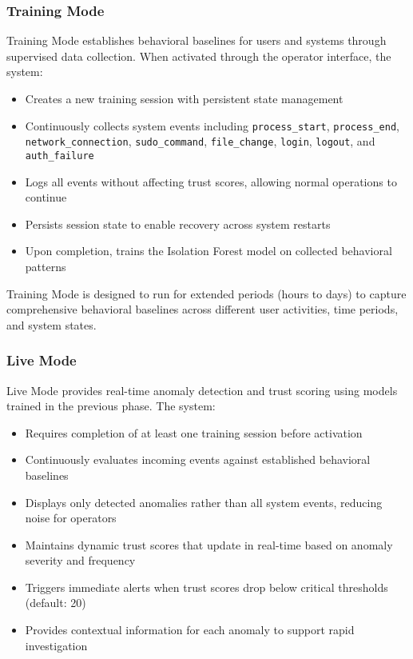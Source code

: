\documentclass[conference]{IEEEtran}
\begin{document}
\subsubsection{Training Mode}
Training Mode establishes behavioral baselines for users and systems through supervised data collection. When activated through the operator interface, the system:
\begin{itemize}[leftmargin=*]
  \item Creates a new training session with persistent state management
  \item Continuously collects system events including \texttt{process\_start}, \texttt{process\_end}, \texttt{network\_connection}, \texttt{sudo\_command}, \texttt{file\_change}, \texttt{login}, \texttt{logout}, and \texttt{auth\_failure}
  \item Logs all events without affecting trust scores, allowing normal operations to continue
  \item Persists session state to enable recovery across system restarts
  \item Upon completion, trains the Isolation Forest model on collected behavioral patterns
\end{itemize}

Training Mode is designed to run for extended periods (hours to days) to capture comprehensive behavioral baselines across different user activities, time periods, and system states.

\subsubsection{Live Mode}
Live Mode provides real-time anomaly detection and trust scoring using models trained in the previous phase. The system:
\begin{itemize}[leftmargin=*]
  \item Requires completion of at least one training session before activation
  \item Continuously evaluates incoming events against established behavioral baselines
  \item Displays only detected anomalies rather than all system events, reducing noise for operators
  \item Maintains dynamic trust scores that update in real-time based on anomaly severity and frequency
  \item Triggers immediate alerts when trust scores drop below critical thresholds (default: 20)
  \item Provides contextual information for each anomaly to support rapid investigation
\end{itemize}
\end{document}
